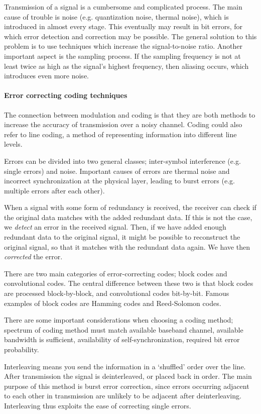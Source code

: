 \documentclass[11pt,titlepage]{report}
\begin{document}
Transmission of a signal is a cumbersome and complicated process. The main cause of trouble is noise (e.g. quantization noise, thermal noise), which is introduced in almost every stage. This eventually may result in bit errors, for which error detection and correction may be possible. The general solution to this problem is to use techniques which increase the signal-to-noise ratio. Another important aspect is the sampling process. If the sampling frequency is not at least twice as high as the signal's highest frequency, then aliasing occurs, which introduces even more noise.

\paragraph{Error correcting coding techniques}
The connection between modulation and coding is that they are both methods to increase the accuracy of transmission over a noisy channel. Coding could also refer to line coding, a method of representing information into different line levels.

Errors can be divided into two general classes; inter-symbol interference (e.g. single errors) and noise. Important causes of errors are thermal noise and incorrect synchronization at the physical layer, leading to burst errors (e.g. multiple errors after each other).

When a signal with some form of redundancy is received, the receiver can check if the original data matches with the added redundant data. If this is not the case, we \emph{detect} an error in the received signal. Then, if we have added enough redundant data to the original signal, it might be possible to reconstruct the original signal, so that it matches with the redundant data again. We have then \emph{corrected} the error.

There are two main categories of error-correcting codes; block codes and convolutional codes. The central difference between these two is that block codes are processed block-by-block, and convolutional codes bit-by-bit. Famous examples of block codes are Hamming codes and Reed-Solomon codes. 

There are some important considerations when choosing a coding method; spectrum of coding method must match available baseband channel, available bandwidth is sufficient, availability of self-synchronization, required bit error probability.

Interleaving means you send the information in a `shuffled' order over the line. After transmission the signal is deinterleaved, or placed back in order. The main purpose of this method is burst error correction, since errors occurring adjacent to each other in transmission are unlikely to be adjacent after deinterleaving. Interleaving thus exploits the ease of correcting single errors.
\end{document}
